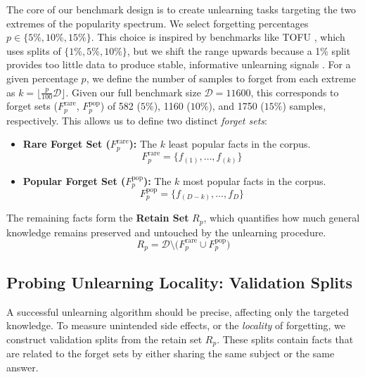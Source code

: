\documentclass[sigconf,anonymous]{aamas}
\begin{document}
The core of our benchmark design is to create unlearning tasks targeting the two extremes of the popularity spectrum. We select forgetting percentages \(p \in \{5\%,10\%,15\%\}\). This choice is inspired by benchmarks like TOFU \cite{maini2024tofu}, which uses splits of \(\{1\%,5\%,10\%\}\), but we shift the range upwards because a 1\% split provides too little data to produce stable, informative unlearning signals \cite{pal2025llm}. For a given percentage $p$, we define the number of samples to forget from each extreme as $k = \lfloor \frac{p}{100}\mathcal{D} \rfloor$. Given our full benchmark size \( \mathcal{D} = 11600 \), this corresponds to forget sets (\( F_p^{\text{rare}} \), \( F_p^{\text{pop}} \)) of 582 (\( 5\% \)), 1160 (\( 10\% \)), and 1750 (\( 15\% \)) samples, respectively.
This allows us to define two distinct \emph{forget sets}:
\begin{itemize}
    \item \textbf{Rare Forget Set ($F_p^{\text{rare}}$):} The $k$ least popular facts in the corpus.
    \begin{equation}
      F_p^{\text{rare}} = \{ f_{(1)}, \dots, f_{(k)} \}
    \end{equation}
    \item \textbf{Popular Forget Set ($F_p^{\text{pop}}$):} The $k$ most popular facts in the corpus.
    \begin{equation}
      F_p^{\text{pop}} = \{ f_{(D - k)}, \dots, f_{D} \}
    \end{equation}
\end{itemize}

The remaining facts form the \textbf{Retain Set} \(R_p\), which quantifies how much general knowledge remains preserved and untouched by the unlearning procedure.
\begin{equation}
  R_p = \mathcal{D} \setminus \bigl(F_p^{\text{rare}} \cup F_p^{\text{pop}}\bigr)
  \label{eq:retain-construction}
\end{equation}


\subsection{Probing Unlearning Locality: Validation Splits}
\label{subsec:duplicates_splits}

A successful unlearning algorithm should be precise, affecting only the targeted knowledge. To measure unintended side effects, or the \emph{locality} of forgetting, we construct validation splits from the retain set $R_p$. These splits contain facts that are related to the forget sets by either sharing the same subject or the same answer.
\end{document}
